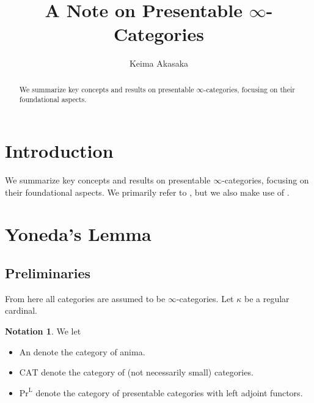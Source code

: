 \documentclass[a4paper,dvipdfmx,11pt,reqno]{amsart}
\newcommand{\An}{\mathrm{An}}
\newcommand{\CAT}{\mathrm{CAT}}
\newcommand{\PrL}{\mathrm{Pr}^{\mathrm{L}}}
\begin{document}
\newtheorem{theorem}{Theorem}[section]
\newtheorem*{definition*}{Definition}
\newtheorem*{theorem*}{Theorem}
\newtheorem*{conjecture*}{Conjecture}

\theoremstyle{definition}
\newtheorem{definition}[theorem]{Definition}
\newtheorem{conjecture}[theorem]{Conjecture}
\newtheorem{construction}[theorem]{Construction}
\newtheorem{corollary}[theorem]{Corollary}
\newtheorem{example}[theorem]{Example}
\newtheorem{lemma}[theorem]{Lemma}
\newtheorem{notation}[theorem]{Notation}
\newtheorem{proposition}[theorem]{Proposition}
\newtheorem{question}[theorem]{Question}
\newtheorem{remark}[theorem]{Remark}
\newtheorem{recall}[theorem]{Recall}


\title{A Note on Presentable \texorpdfstring{$\infty$}{infty}-Categories}
\author{Keima Akasaka}
\maketitle 

\begin{abstract}
  We summarize key concepts and results on presentable $\infty$-categories, focusing on their foundational aspects.
\end{abstract} 

\setcounter{tocdepth}{2}
\tableofcontents   

\section{Introduction}

We summarize key concepts and results on presentable $\infty$-categories, focusing on their foundational aspects.
We primarily refer to \cite{HTT}, but we also make use of \cite{KNP,kerodon,Gal23}.

\section{Yoneda's Lemma}

\subsection{Preliminaries}

From here all categories are assumed to be $\infty$-categories.
Let $\kappa$ be a regular cardinal.

\begin{notation}
  We let 
\begin{itemize}
  \item $\An$ denote the category of anima.
  \item $\CAT$ denote the category of (not necessarily small) categories.
  \item $\PrL$ denote the category of presentable categories with left adjoint functors.
\end{itemize}
\end{notation}
\end{document}
